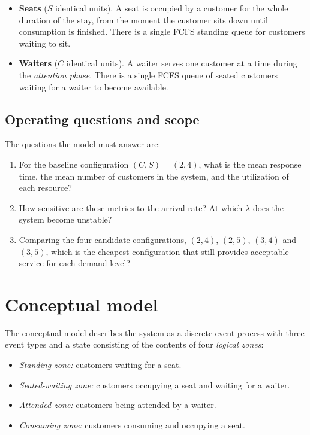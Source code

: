 \documentclass[11pt,a4paper]{article}
\begin{document}
\begin{itemize}
\item \textbf{Seats} ($S$ identical units). A seat is occupied by a customer
for the whole duration of the stay, from the moment the customer sits
down until consumption is finished. There is a single FCFS standing
queue for customers waiting to sit.
\item \textbf{Waiters} ($C$ identical units). A waiter serves one customer
at a time during the \emph{attention phase}. There is a single FCFS
queue of seated customers waiting for a waiter to become available.
\end{itemize}

\subsection{Operating questions and scope}
The questions the model must answer are:

\begin{enumerate}
\item For the baseline configuration $(C,S)=(2,4)$, what is the mean
response time, the mean number of customers in the system, and the
utilization of each resource?
\item How sensitive are these metrics to the arrival rate? At which
$\lambda$ does the system become unstable?
\item Comparing the four candidate configurations, $(2,4)$, $(2,5)$,
$(3,4)$ and $(3,5)$, which is the cheapest configuration that still
provides acceptable service for each demand level?
\end{enumerate}

\section{Conceptual model}

The conceptual model describes the system as a discrete-event process
with three event types and a state consisting of the contents of four
\emph{logical zones}:

\begin{itemize}
\item \emph{Standing zone:} customers waiting for a seat.
\item \emph{Seated-waiting zone:} customers occupying a seat and waiting
for a waiter.
\item \emph{Attended zone:} customers being attended by a waiter.
\item \emph{Consuming zone:} customers consuming and occupying a seat.
\end{itemize}
\end{document}
